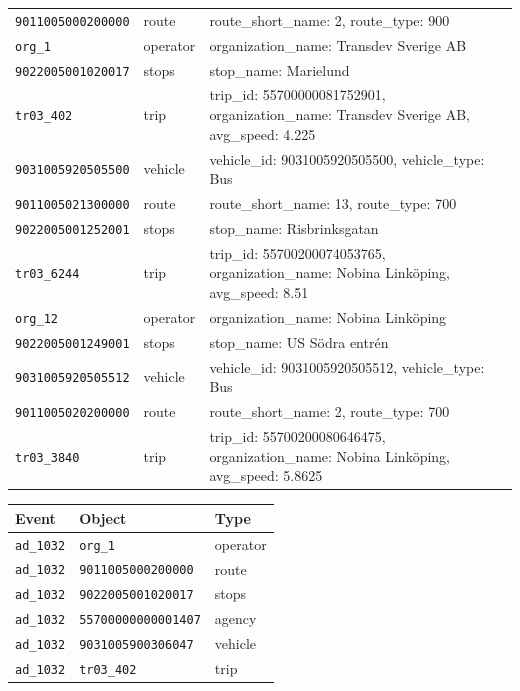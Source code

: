 \begin{table}[htbp]
\begin{minipage}[t]{.58\textwidth}
\begin{tabularx}{\textwidth}{p{2.3cm}p{1.35cm}X}
  \texttt{9011005000200000}  & route    & route\_short\_name: 2, route\_type: 900 \\
  \texttt{org\_1}            & operator & organization\_name: Transdev Sverige AB \\
  \texttt{9022005001020017}  & stops    & stop\_name: Marielund \\
  \texttt{tr03\_402}         & trip     & trip\_id: 55700000081752901, organization\_name: Transdev Sverige AB, avg\_speed: 4.225 \\
  \texttt{9031005920505500}  & vehicle  & vehicle\_id: 9031005920505500, vehicle\_type: Bus \\
  \texttt{9011005021300000}  & route    & route\_short\_name: 13, route\_type: 700 \\
  \texttt{9022005001252001}  & stops    & stop\_name: Risbrinksgatan \\
  \texttt{tr03\_6244}        & trip     & trip\_id: 55700200074053765, organization\_name: Nobina Linköping, avg\_speed: 8.51 \\
  \texttt{org\_12}           & operator & organization\_name: Nobina Linköping \\
  \texttt{9022005001249001}  & stops    & stop\_name: US Södra entrén \\
  \texttt{9031005920505512}  & vehicle  & vehicle\_id: 9031005920505512, vehicle\_type: Bus \\
  \texttt{9011005020200000}  & route    & route\_short\_name: 2, route\_type: 700 \\
  \texttt{tr03\_3840}        & trip     & trip\_id: 55700200080646475, organization\_name: Nobina Linköping, avg\_speed: 5.8625 \\
    \bottomrule
    \end{tabularx}
  \end{minipage}
  \hfill
    \begin{minipage}[t]{.38\textwidth}
    \strut\vspace*{-\baselineskip}\newline

    \begin{tabular}{lll}
    \toprule
    \textbf{Event} & \textbf{Object} & \textbf{Type} \\
    \midrule
    \texttt{ad\_1032} & \texttt{org\_1}            & operator \\
    \texttt{ad\_1032} & \texttt{9011005000200000}  & route \\
    \texttt{ad\_1032} & \texttt{9022005001020017}  & stops \\
    \texttt{ad\_1032} & \texttt{55700000000001407} & agency \\
    \texttt{ad\_1032} & \texttt{9031005900306047}  & vehicle \\
    \texttt{ad\_1032} & \texttt{tr03\_402}         & trip \\


\end{tabular}
\end{minipage}
\end{table}
